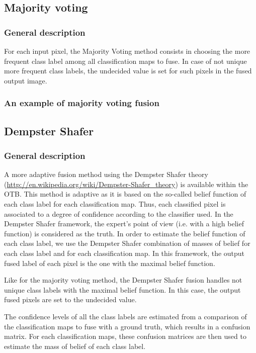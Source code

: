 \subsection{Majority voting}
\subsubsection{General description}
For each input pixel, the Majority Voting method consists in choosing the more 
frequent class label among all classification maps to fuse. In case of not unique 
more frequent class labels, the undecided value is set for such pixels in 
the fused output image.

\subsubsection{An example of majority voting fusion}
\ifitkFullVersion

\fi


\subsection{Dempster Shafer}

\subsubsection{General description}
A more adaptive fusion method using the Dempster Shafer theory 
(\href{http://en.wikipedia.org/wiki/Dempster-Shafer_theory}{http://en.wikipedia.org/wiki/Dempster-Shafer\_theory}) 
is available within the OTB. This method is adaptive as it is based on the 
so-called belief function of each class label for each classification map. Thus, 
each classified pixel is associated to a degree of confidence according to the 
classifier used. In the Dempster Shafer framework, the expert's point of view 
(i.e. with a high belief function) is considered as the truth. In order to 
estimate the belief function of each class label, we use the Dempster Shafer 
combination of masses of belief for each class label and for each classification 
map. In this framework, the output fused label of each pixel is the one with the 
maximal belief function.

Like for the majority voting method, the Dempster Shafer fusion handles not 
unique class labels with the maximal belief function. In this case, the output 
fused pixels are set to the undecided value.

The confidence levels of all the class labels are estimated from a comparison of 
the classification maps to fuse with a ground truth, which results in a 
confusion matrix. For each classification maps, these confusion matrices are then 
used to estimate the mass of belief of each class label.


